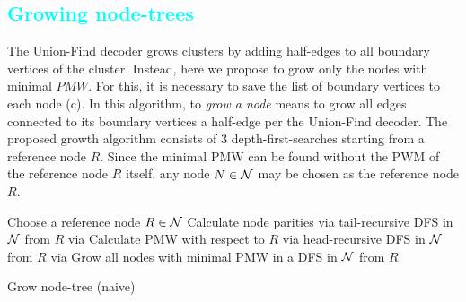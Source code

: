 
\subsection{\textcolor{cyan}{Growing node-trees}}\label{sec:grownodetrees}

The Union-Find decoder grows clusters by adding half-edges to all boundary vertices of the cluster. Instead, here we propose to grow only the nodes with minimal $PMW$. For this, it is necessary to save the list of boundary vertices to each node (c). In this algorithm, to \emph{grow a node} means to grow all edges connected to its boundary vertices a half-edge per the Union-Find decoder. The proposed growth algorithm consists of 3 depth-first-searches starting from a reference node $R$. Since the minimal PMW can be found without the PWM of the reference node $R$ itself, any node $N\in\mathcal{N}$ may be chosen as the reference node $R$. 

\begin{algorithm}[h]
  \BlankLine
  \KwResult{$\nset$}
  \BlankLine
  
  Choose a reference node $R \in \mathcal{N}$\;
  Calculate node parities via tail-recursive DFS in $\nset$ from $R$ via \;
  Calculate PMW with respect to $R$ via head-recursive DFS in $\nset$ from $R$ via \; 
  Grow all nodes with minimal PMW in a DFS in $\nset$ from $R$\;

  \caption{Grow node-tree (naive)}\label{algo:grow}
\end{algorithm}

